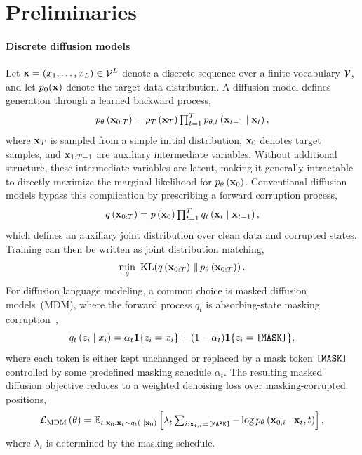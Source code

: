 \section{Preliminaries}

\label{sec:prelim}

\paragraph{Discrete diffusion models}
Let $\mathbf{x}=(x_1,\dots,x_L)\in\mathcal{V}^L$ denote a discrete sequence over a finite vocabulary $\mathcal{V}$, and let $p_0(\mathbf{x})$ denote the target data distribution.
A diffusion model defines generation through a learned backward process,
\begin{equation}
    p_\theta\left(\mathbf{x}_{0:T}\right) = \textstyle p_T\left(\mathbf{x}_T\right)\prod_{t=1}^{T}p_{\theta,t}\left(\mathbf{x}_{t-1}\mid \mathbf{x}_t\right),
    \label{eq:backward_joint}
\end{equation}
where $\mathbf{x}_T$ is sampled from a simple initial distribution, $\mathbf{x}_0$ denotes target samples, and $\mathbf{x}_{1:T-1}$ are auxiliary intermediate variables. 
Without additional structure, these intermediate variables are latent, making it generally intractable to directly maximize the marginal likelihood for $p_\theta\left(\mathbf{x}_0\right)$. Conventional diffusion models bypass this complication by prescribing a forward corruption process,
\begin{equation}
    q\left(\mathbf{x}_{0:T}\right) = \textstyle p\left(\mathbf{x}_0\right)\prod_{t=1}^{T}q_t\left(\mathbf{x}_t\mid \mathbf{x}_{t-1}\right),
    \label{eq:forward_joint}
\end{equation}
which defines an auxiliary joint distribution over clean data and corrupted states. 
Training can then be written as joint distribution matching, 
\begin{equation}
    \min_{\theta}\,\,\operatorname{KL}\!\left(
    q\left(\mathbf{x}_{0:T}\right)\,\|\, p_\theta\left(\mathbf{x}_{0:T}\right)
    \right).
    \label{eq:joint_kl}
\end{equation}
For diffusion language modeling, a common choice is masked diffusion models~(MDM), where the forward process $q_t$ is absorbing-state masking corruption~\citep{MD4, MDLM},
\begin{equation}
    q_t\left(z_i\mid x_i\right)=\alpha_t \mathbf{1}\{z_i=x_i\}+ (1-\alpha_t)\mathbf{1}\{z_i=\texttt{[MASK]}\}, 
    \label{eq:mdm_forward}
\end{equation}
where each token is either kept unchanged or replaced by a mask token $\texttt{[MASK]}$ controlled by some predefined masking schedule $\alpha_t$.
The resulting masked diffusion objective reduces to a weighted denoising loss over masking-corrupted positions, 
\begin{equation}
    \mathcal{L}_{\mathrm{MDM}}\left(\theta\right) =\textstyle
    \mathbb{E}_{t,\mathbf{x}_0,\mathbf{x}_t\sim q_t(\cdot\mid \mathbf{x}_0)}
    \left[\lambda_t\sum_{i:\mathbf{x}_{t,i}=\texttt{[MASK]}}-\log p_\theta\left(\mathbf{x}_{0,i}\mid \mathbf{x}_t,t\right)
    \right],
    \label{eq:mdm_objective}
\end{equation}
where $\lambda_t$ is determined by the masking schedule. 

